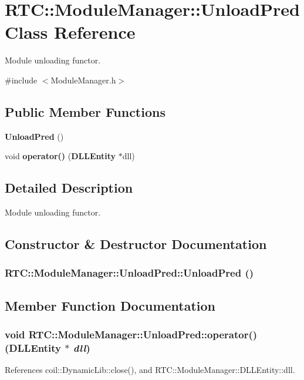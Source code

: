 \section{RTC::ModuleManager::UnloadPred Class Reference}
\label{classRTC_1_1ModuleManager_1_1UnloadPred}


Module unloading functor.  




{\ttfamily \#include $<$ModuleManager.h$>$}

\subsection*{Public Member Functions}
\begin{DoxyCompactItemize}
\item 
{\bf UnloadPred} ()
\item 
void {\bf operator()} ({\bf DLLEntity} $\ast$dll)
\end{DoxyCompactItemize}


\subsection{Detailed Description}
Module unloading functor. 

\subsection{Constructor \& Destructor Documentation}
\subsubsection[{UnloadPred}]{\setlength{\rightskip}{0pt plus 5cm}RTC::ModuleManager::UnloadPred::UnloadPred ()\hspace{0.3cm}{\ttfamily  [inline]}}\label{classRTC_1_1ModuleManager_1_1UnloadPred_a15b19c95fe3ce5851e521af92260f226}


\subsection{Member Function Documentation}
\subsubsection[{operator()}]{\setlength{\rightskip}{0pt plus 5cm}void RTC::ModuleManager::UnloadPred::operator() ({\bf DLLEntity} $\ast$ {\em dll})\hspace{0.3cm}{\ttfamily  [inline]}}\label{classRTC_1_1ModuleManager_1_1UnloadPred_acccf2b1a74cee5b7aaaa306298b7d6c0}


References coil::DynamicLib::close(), and RTC::ModuleManager::DLLEntity::dll.

